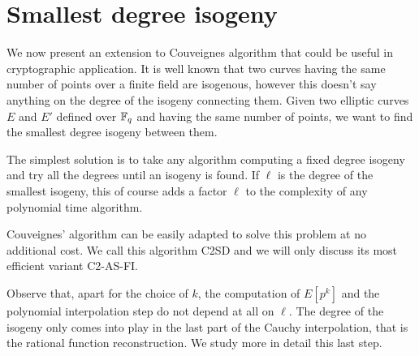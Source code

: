 \section{Smallest degree isogeny}
\label{sec:bounded}

We now present an extension to Couveignes algorithm that could be
useful in cryptographic application. It is well known that two curves
having the same number of points over a finite field are isogenous,
however this doesn't say anything on the degree of the isogeny
connecting them. Given two elliptic curves $E$ and $E'$ defined over
$\mathbb{F}_q$ and having the same number of points, we want to find the
smallest degree isogeny between them.

The simplest solution is to take any algorithm computing a fixed
degree isogeny and try all the degrees until an isogeny is found. If
$\ell$ is the degree of the smallest isogeny, this of course adds a
factor $\ell$ to the complexity of any polynomial time algorithm.

Couveignes' algorithm can be easily adapted to solve this problem at
no additional cost. We call this algorithm C2SD and we will only
discuss its most efficient variant C2-AS-FI.

Observe that, apart for the choice of $k$, the computation of $E[p^k]$
and the polynomial interpolation step do not depend at all on
$\ell$. The degree of the isogeny only comes into play in the last
part of the Cauchy interpolation, that is the rational function
reconstruction. We study more in detail this last step.


